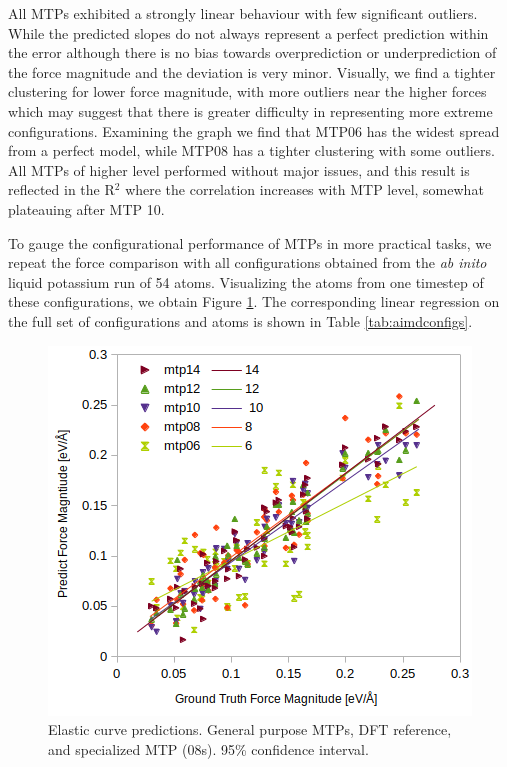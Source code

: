 \documentclass[9pt,twocolumn,twoside]{opticajnl}
\begin{document}
All MTPs exhibited a strongly linear behaviour with few significant outliers. While the predicted slopes do not always represent a perfect prediction within the error although there is no bias towards overprediction or underprediction of the force magnitude and the deviation is very minor. Visually, we find a tighter clustering for lower force magnitude, with more outliers near the higher forces which may suggest that there is greater difficulty in representing more extreme configurations. Examining the graph we find that MTP06 has the widest spread from a perfect model, while MTP08 has a tighter clustering with some outliers. All MTPs of higher level performed without major issues, and this result is reflected in the R$^2$ where the correlation increases with MTP level, somewhat plateauing after MTP 10.

To gauge the configurational performance of MTPs in more practical tasks, we repeat the force comparison with all configurations obtained from the \textit{ab inito} liquid potassium run of 54 atoms. Visualizing the atoms from one timestep of these configurations, we obtain Figure \ref{fig:aimdconfigs}. The corresponding linear regression on the full set of configurations and atoms is shown in Table \ref{tab:aimdconfigs}.

\begin{figure}[ht]
  \centering
  \includegraphics[width=\linewidth]{assets/aimdconfigurations.png}
  \caption{Elastic curve predictions. General purpose MTPs, DFT reference, and specialized MTP (08s). 95\% confidence interval.}
  \label{fig:aimdconfigs}
\end{figure}
\end{document}

